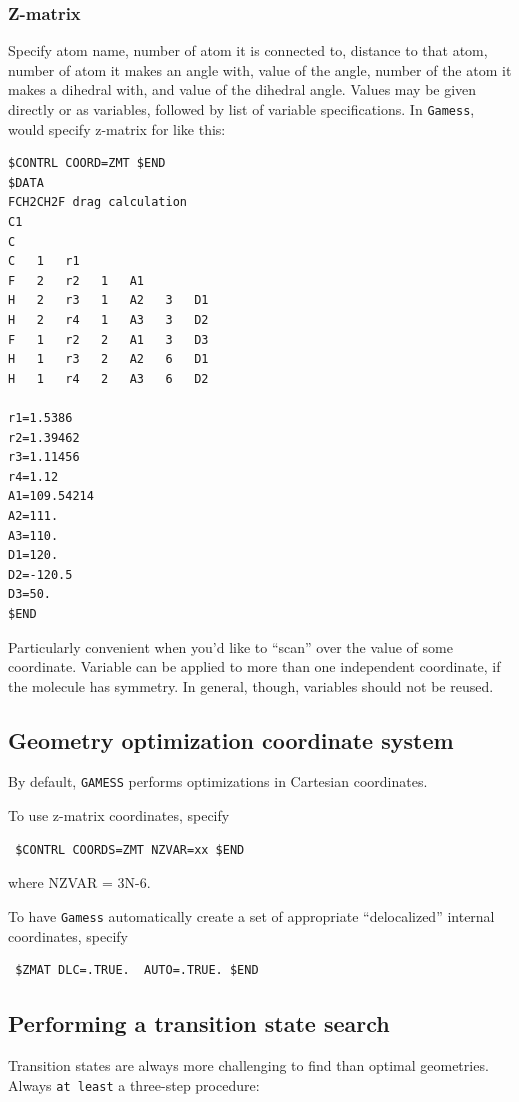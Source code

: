 \documentclass[11pt]{article}
\begin{document}
\subsubsection{Z-matrix}
\label{sec:orga9238da}
Specify atom name, number of atom it is connected to, distance to that atom, number of atom it makes an angle with, value of the angle, number of the atom it makes a dihedral with, and value of the dihedral angle.  Values may be given directly or as variables, followed by list of variable specifications.  In \texttt{Gamess}, would specify z-matrix for  like this:
\begin{verbatim}
$CONTRL COORD=ZMT $END
$DATA
FCH2CH2F drag calculation
C1
C
C   1   r1
F   2   r2   1   A1
H   2   r3   1   A2   3   D1
H   2   r4   1   A3   3   D2
F   1   r2   2   A1   3   D3
H   1   r3   2   A2   6   D1
H   1   r4   2   A3   6   D2

r1=1.5386
r2=1.39462
r3=1.11456
r4=1.12
A1=109.54214
A2=111.
A3=110.
D1=120.
D2=-120.5
D3=50.
$END
\end{verbatim}
Particularly convenient when you'd like to ``scan'' over the value of some coordinate.  Variable can be applied to more than one independent coordinate, if the molecule has symmetry.  In general, though, variables should not be reused.

\subsection{Geometry optimization coordinate system}
\label{sec:orgb869be7}
By default, \texttt{GAMESS} performs optimizations in Cartesian coordinates.

To use z-matrix coordinates, specify
\begin{verbatim}
 $CONTRL COORDS=ZMT NZVAR=xx $END
\end{verbatim}
where NZVAR = 3N-6.

To have \texttt{Gamess} automatically create a set of appropriate ``delocalized'' internal coordinates, specify
\begin{verbatim}
 $ZMAT DLC=.TRUE.  AUTO=.TRUE. $END
\end{verbatim}
\subsection{Performing a transition state search}
\label{sec:org89f69ef}
Transition states are always more challenging to find than optimal geometries.  Always \texttt{at least} a three-step procedure:
\end{document}
